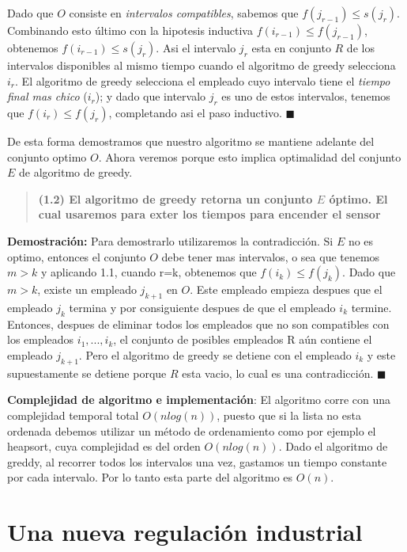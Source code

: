 \documentclass{article}
\begin{document}
Dado que \(O\) consiste en \textit{intervalos compatibles}, sabemos que \(f(j_{r-1}) \leq s(j_r)\). Combinando esto último con la hipotesis inductiva \(f(i_{r-1}) \leq f(j_{r-1})\), obtenemos \(f(i_{r-1}) \leq s(j_{r})\). 
Asi el intervalo \(j_r\) esta en conjunto \(R\) de los intervalos disponibles al mismo tiempo cuando el algoritmo de greedy selecciona \(i_r\).
El algoritmo de greedy selecciona el empleado cuyo intervalo tiene el \textit{tiempo final mas chico} (\(i_{r}\)); y dado que intervalo \(j_{r}\) es uno de estos intervalos, tenemos que \(f(i_r) \leq f(j_r)\), completando asi el paso inductivo. \(\blacksquare\)

De esta forma demostramos que nuestro algoritmo se mantiene adelante del conjunto optimo \(O\). Ahora veremos porque esto implica optimalidad del conjunto \(E\) de algoritmo de greedy.

\begin{quote}
    \textbf{(1.2) El algoritmo de greedy retorna un conjunto \(E\) óptimo. El cual usaremos para exter los tiempos para encender el sensor}
\end{quote}

\textbf{Demostración:} Para demostrarlo utilizaremos la contradicción. Si \(E\) no es optimo, entonces el conjunto \(O\) debe tener mas intervalos, o sea que tenemos \(m>k\) y aplicando 1.1, cuando r=k, 
obtenemos que \(f(i_k) \leq f(j_k)\). Dado que \(m>k\), existe un empleado \(j_{k+1}\) en \(O\). Este empleado empieza despues que el empleado \(j_k\) termina y por consiguiente despues de que el empleado \(i_k\) termine.
Entonces, despues de eliminar todos los empleados que no son compatibles con los empleados \(i_1,...,i_k\), el conjunto de posibles empleados R aún contiene el empleado \(j_{k+1}\). 
Pero el algoritmo de greedy se detiene con el empleado \(i_k\) y este supuestamente se detiene porque \(R\) esta vacio, lo cual es una contradicción. \(\blacksquare\)

\textbf{Complejidad de algoritmo e implementación}: 
El algoritmo corre con una complejidad temporal total \(O(nlog(n))\), puesto que si la lista no esta ordenada 
debemos utilizar un método de ordenamiento como por ejemplo el heapsort, cuya complejidad es del 
orden \(O(n log(n))\). 
Dado el algoritmo de greddy, al recorrer todos los intervalos una vez, gastamos un tiempo constante 
por cada intervalo. Por lo tanto esta parte del algoritmo es \(O(n)\).

\newpage
\section{Una nueva regulación industrial}
\end{document}
